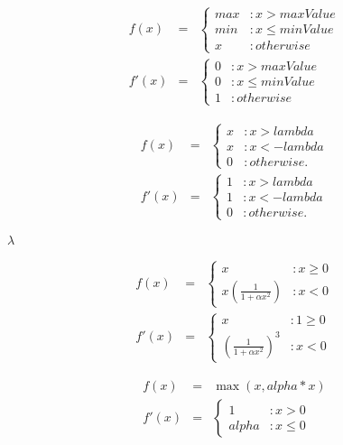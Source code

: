 \documentclass{article}
\begin{document}
\begin{eqnarray*} f(x) &=& \left\{ \begin{array}{lr} max & : x > maxValue \\ min & : x \le minValue \\ x & : otherwise \end{array} \right. \\ f'(x) &=& \left\{ \begin{array}{lr} 0 & : x > maxValue \\ 0 & : x \le minValue \\ 1 & : otherwise \end{array} \right. \end{eqnarray*}
\pagebreak

\begin{eqnarray*} f(x) &=& \begin{cases} x & : x > lambda \\ x & : x < -lambda \\ 0 & : otherwise. \end{cases} \\ f'(x) &=& \begin{cases} 1 & : x > lambda \\ 1 & : x < -lambda \\ 0 & : otherwise. \end{cases} \end{eqnarray*}
\pagebreak

$\lambda$
\pagebreak

\begin{eqnarray*} f(x) &=& \left\{ \begin{array}{lr} x & : x \ge 0 \\ x(\frac{1}{1 + \alpha x^2}) & : x < 0 \end{array} \right. \\ f'(x) &=& \left\{ \begin{array}{lr} x & : 1 \ge 0 \\ (\frac{1}{1 + \alpha x^2})^3 & : x < 0 \end{array} \right. \end{eqnarray*}
\pagebreak

\begin{eqnarray*} f(x) &=& \max(x, alpha*x) \\ f'(x) &=& \left\{ \begin{array}{lr} 1 & : x > 0 \\ alpha & : x \le 0 \end{array} \right. \end{eqnarray*}
\pagebreak
\end{document}
